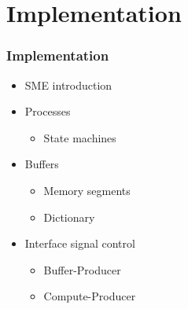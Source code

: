 \section{Implementation}
\newcommand{\ImplementationTitle}{Implementation}
\begin{frame}
    \frametitle{\ImplementationTitle}
    \centering
    \begin{minipage}{1\textwidth}
        \begin{itemize}%
            \item SME introduction
            \item Processes
            \begin{itemize}
                \item State machines
            \end{itemize}
            \item Buffers
            \begin{itemize}
                \item Memory segments
                \item Dictionary
            \end{itemize}
            \item Interface signal control
            \begin{itemize}
                \item Buffer-Producer
                \item Compute-Producer
            \end{itemize}
        \end{itemize}
    \end{minipage}
\end{frame}

